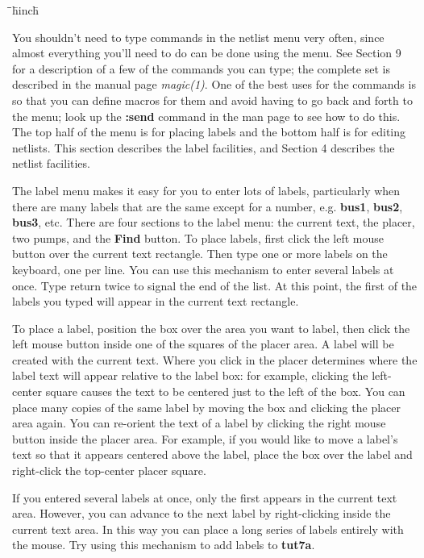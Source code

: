 \documentclass[letterpaper,twoside,12pt]{article}
\def\hinch{\hspace*{0.5in}}
\def\starti{\begin{center}\begin{tabbing}\hinch\=\hinch\=\hinch\=hinch\hinch\=\kill}
\def\endi{\end{tabbing}\end{center}}
\def\ii{\>\>\>}
\begin{document}
\starti
   \ii {\bfseries :help}
\endi

You shouldn't need to type commands in the netlist menu very often,
since almost everything you'll need to do can be done using
the menu.  See Section 9 for a description of a few of the commands you
can type;  the complete set is described in the manual
page {\itshape magic(1)}.  One of the best uses for the commands is so
that you can define macros for them and avoid having to go back and
forth to the menu;  look up the {\bfseries :send} command in the man page
to see how to do this.
The top half of the
menu is for placing labels and the bottom half is for editing
netlists.  This section describes the
label facilities, and Section 4 describes the netlist facilities.

The label menu makes it easy for you to enter lots
of labels, particularly when there are many labels that are the
same except for a number, e.g. {\bfseries bus1}, {\bfseries bus2}, {\bfseries bus3},
etc.  There are four sections to the label menu:  the current text,
the placer, two pumps, and the {\bfseries Find} button.  To place labels,
first click the left mouse button over the current text rectangle.
Then type one or more labels on the keyboard, one per
line.  You can use this mechanism to enter several labels at once.
Type return twice to signal the end of
the list.  At this point, the first of the labels you typed will
appear in the current text rectangle.

To place a label, position the box over the area you want to label,
then click the left mouse button inside one of the squares of the
placer area.  A label will be created with the current text.
Where you click in the placer determines where the label text
will appear relative to the label box:  for example, clicking the left-center
square causes the text to be centered just to the left of the box.
You can place many copies of the same label by moving the box and
clicking the placer area again.  You can
re-orient the text of a label by clicking the right mouse button
inside the placer area.  For example, if you would like to
move a label's text so that it appears centered above the label,
place the box over the label and right-click the top-center placer
square.

If you entered several labels at once, only the first appears in
the current text area.  However, you can advance to the next label
by right-clicking inside the current text area.  In this way you
can place a long series of labels entirely with the mouse.  Try
using this mechanism to add labels to {\bfseries tut7a}.
\end{document}
